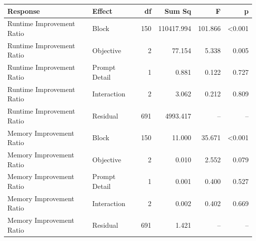 \begin{tabular}{llrrrr}
\toprule
Response & Effect & df & Sum Sq & F & p \\
\midrule
Runtime Improvement Ratio & Block & 150 & 110417.994 & 101.866 & <0.001 \\
Runtime Improvement Ratio & Objective & 2 & 77.154 & 5.338 & 0.005 \\
Runtime Improvement Ratio & Prompt Detail & 1 & 0.881 & 0.122 & 0.727 \\
Runtime Improvement Ratio & Interaction & 2 & 3.062 & 0.212 & 0.809 \\
Runtime Improvement Ratio & Residual & 691 & 4993.417 & -- & -- \\
Memory Improvement Ratio & Block & 150 & 11.000 & 35.671 & <0.001 \\
Memory Improvement Ratio & Objective & 2 & 0.010 & 2.552 & 0.079 \\
Memory Improvement Ratio & Prompt Detail & 1 & 0.001 & 0.400 & 0.527 \\
Memory Improvement Ratio & Interaction & 2 & 0.002 & 0.402 & 0.669 \\
Memory Improvement Ratio & Residual & 691 & 1.421 & -- & -- \\
\bottomrule
\end{tabular}
